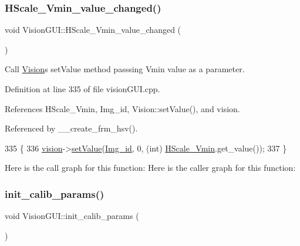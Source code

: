 \subsubsection{\texorpdfstring{H\+Scale\+\_\+\+Vmin\+\_\+value\+\_\+changed()}{HScale\_Vmin\_value\_changed()}}
{\footnotesize\ttfamily void Vision\+G\+U\+I\+::\+H\+Scale\+\_\+\+Vmin\+\_\+value\+\_\+changed (\begin{DoxyParamCaption}{ }\end{DoxyParamCaption})\hspace{0.3cm}{\ttfamily [private]}}



Call \hyperlink{class_vision}{Vision}\textquotesingle{}s set\+Value method passsing Vmin value as a parameter. 



Definition at line 335 of file vision\+G\+U\+I.\+cpp.



References H\+Scale\+\_\+\+Vmin, Img\+\_\+id, Vision\+::set\+Value(), and vision.



Referenced by \+\_\+\+\_\+create\+\_\+frm\+\_\+hsv().


\begin{DoxyCode}
335                                           \{
336     \hyperlink{class_vision_g_u_i_a36aba058af844ec6cbe0c945c616cd5f}{vision}->\hyperlink{class_vision_a43213a295e6e199c261d141118be14ad}{setValue}(\hyperlink{class_vision_g_u_i_a4a46f114bc58e0f1d56b655f4bc8f9d8}{Img\_id}, 0, (\textcolor{keywordtype}{int}) \hyperlink{class_vision_g_u_i_a8a1e7f6d4357eceab8e47fe0fb523cf9}{HScale\_Vmin}.get\_value());
337 \}
\end{DoxyCode}
Here is the call graph for this function\+:
Here is the caller graph for this function\+:
\mbox{\label{class_vision_g_u_i_a39e2afb8ee3002e43b15758604597c9c}} 
\subsubsection{\texorpdfstring{init\+\_\+calib\+\_\+params()}{init\_calib\_params()}}
{\footnotesize\ttfamily void Vision\+G\+U\+I\+::init\+\_\+calib\+\_\+params (\begin{DoxyParamCaption}{ }\end{DoxyParamCaption})\hspace{0.3cm}{\ttfamily [private]}}



